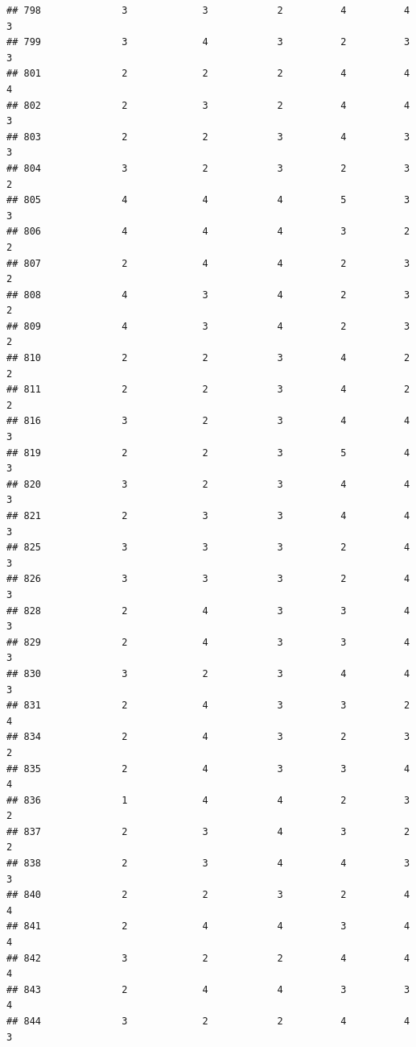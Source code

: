 \documentclass[
]{article}
\begin{document}
\begin{verbatim}
## 798              3             3            2          4          4        3
## 799              3             4            3          2          3        3
## 801              2             2            2          4          4        4
## 802              2             3            2          4          4        3
## 803              2             2            3          4          3        3
## 804              3             2            3          2          3        2
## 805              4             4            4          5          3        3
## 806              4             4            4          3          2        2
## 807              2             4            4          2          3        2
## 808              4             3            4          2          3        2
## 809              4             3            4          2          3        2
## 810              2             2            3          4          2        2
## 811              2             2            3          4          2        2
## 816              3             2            3          4          4        3
## 819              2             2            3          5          4        3
## 820              3             2            3          4          4        3
## 821              2             3            3          4          4        3
## 825              3             3            3          2          4        3
## 826              3             3            3          2          4        3
## 828              2             4            3          3          4        3
## 829              2             4            3          3          4        3
## 830              3             2            3          4          4        3
## 831              2             4            3          3          2        4
## 834              2             4            3          2          3        2
## 835              2             4            3          3          4        4
## 836              1             4            4          2          3        2
## 837              2             3            4          3          2        2
## 838              2             3            4          4          3        3
## 840              2             2            3          2          4        4
## 841              2             4            4          3          4        4
## 842              3             2            2          4          4        4
## 843              2             4            4          3          3        4
## 844              3             2            2          4          4        3

\end{verbatim}
\end{document}
